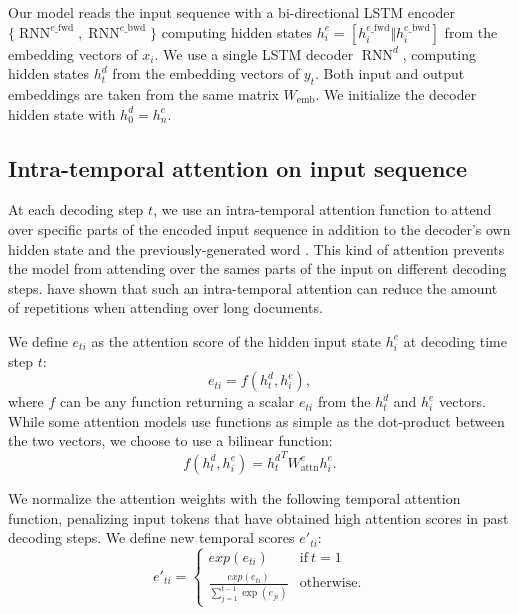 \documentclass{article} \usepackage{iclr2018_arxiv,times}
\DeclareMathOperator{\RNN}{RNN}
\begin{document}
Our model reads the input sequence with a bi-directional LSTM encoder $\{\RNN^{e\_\textrm{fwd}}, \RNN^{e\_\textrm{bwd}}\}$ computing hidden states $h^e_i = [h^{e\_\textrm{fwd}}_i \Vert h^{e\_\textrm{bwd}}_i]$ from the embedding vectors of $x_i$. We use a single LSTM decoder $\RNN^d$, computing hidden states $h^d_t$ from the embedding vectors of $y_t$. Both input and output embeddings are taken from the same matrix $W_\textrm{emb}$. We initialize the decoder hidden state with $h^d_0 = h^e_n$.

\subsection{Intra-temporal attention on input sequence}
\label{ssec:tmp-attention}

At each decoding step $t$, we use an intra-temporal attention function to attend over specific parts of the encoded input sequence in addition to the decoder's own hidden state and the previously-generated word \citep{sankaran2016}. This kind of attention prevents the model from attending over the sames parts of the input on different decoding steps. \citet{nallapati2016} have shown that such an intra-temporal attention can reduce the amount of repetitions when attending over long documents.


We define $e_{ti}$ as the attention score of the hidden input state $h^e_i$ at decoding time step $t$:
\begin{equation}
e_{ti} = f(h^d_t, h^e_i),
\label{eq:attention-weights-unnorm}
\end{equation}
where $f$ can be any function returning a scalar $e_{ti}$ from the $h^d_t$ and $h^e_i$ vectors. While some attention models use functions as simple as the dot-product between the two vectors, we choose to use a bilinear function: 
\begin{equation}
f(h^d_t, h^e_i) = {h^d_t}^T W^e_\textrm{attn} h^e_i.
\label{eq:attention-function}
\end{equation}

We normalize the attention weights with the following temporal attention function, penalizing input tokens that have obtained high attention scores in past decoding steps. We define new temporal scores $e'_{ti}$:
\begin{equation}
e'_{ti} = \begin{cases}
    exp(e_{ti}) & \text{if}\ t = 1 \\
    \frac{exp(e_{ti})}{\sum_{j=1}^{t-1} \exp(e_{ji})} & \text{otherwise}.
    \end{cases}
\label{eq:temporal-attention-2}
\end{equation}
\end{document}
